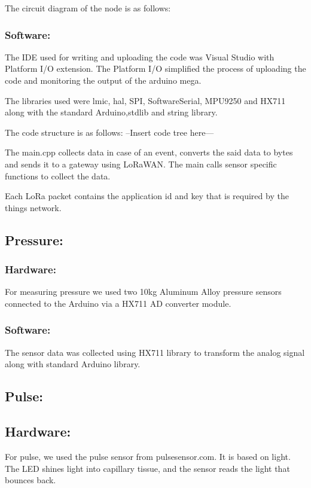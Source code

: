 The circuit diagram of the node is as follows:



\subsubsection{Software:}
The IDE used for writing and uploading the code was Visual Studio with Platform I/O extension. The Platform I/O simplified the process of uploading the code and monitoring the output of the arduino mega.

The libraries used were lmic, hal, SPI, SoftwareSerial, MPU9250 and HX711 along with the standard Arduino,stdlib and string library.

The code structure is as follows:
--Insert code tree here---

The main.cpp collects data in case of an event, converts the said data to bytes and sends it to a gateway using LoRaWAN. The main calls sensor specific functions to collect the data. 

Each LoRa packet contains the application id and key that is required by the things network.

\subsection{Pressure:}

\subsubsection{Hardware:}
For measuring pressure we used two 10kg Aluminum Alloy pressure sensors connected to the Arduino via a HX711 AD converter module. 

\subsubsection{Software:}
The sensor data was collected using HX711 library to transform the analog signal along with standard Arduino library. 

\subsection{Pulse:}

\subsection{Hardware:}
For pulse, we used the pulse sensor from pulsesensor.com. It is based on light. The LED shines light into capillary tissue, and the sensor reads the light that bounces back.


